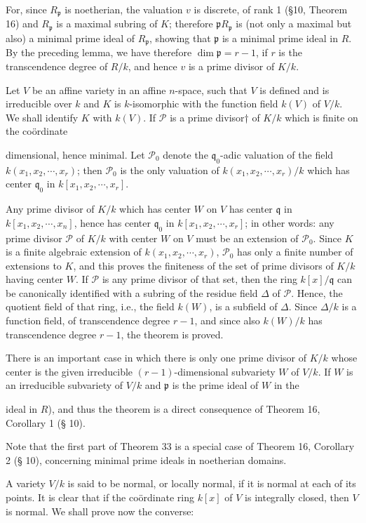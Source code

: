 For, since $R_{\mathfrak{p}}$ is noetherian, the valuation $v$ is discrete, of rank 1 (§10, Theorem 16) and $R_{\mathfrak{p}}$ is a maximal subring of $K$; therefore $\mathfrak{p}R_{\mathfrak{p}}$ is (not only a maximal but also) a minimal prime ideal of $R_{\mathfrak{p}}$, showing that $\mathfrak{p}$ is a minimal prime ideal in $R$. By the preceding lemma, we have therefore $\dim \mathfrak{p} = r-1$, if $r$ is the transcendence degree of $R/k$, and hence $v$ is a prime divisor of $K/k$.

Let $V$ be an affine variety in an affine $n$-space, such that $V$ is defined and is irreducible over $k$ and $K$ is $k$-isomorphic with the function field $k(V)$ of $V/k$. We shall identify $K$ with $k(V)$. If $\mathcal{P}$ is a prime divisor† of $K/k$ which is finite on the coördinate

dimensional, hence minimal. Let $\mathcal{P}_0$ denote the $\mathfrak{q}_0$-adic valuation of the field $k(x_1, x_2, \cdots, x_r)$; then $\mathcal{P}_0$ is the only valuation of $k(x_1, x_2, \cdots, x_r)/k$ which has center $\mathfrak{q}_0$ in $k[x_1, x_2, \cdots, x_r]$.

Any prime divisor of $K/k$ which has center $W$ on $V$ has center $\mathfrak{q}$ in $k[x_1, x_2, \cdots, x_n]$, hence has center $\mathfrak{q}_0$ in $k[x_1, x_2, \cdots, x_r]$; in other words: any prime divisor $\mathcal{P}$ of $K/k$ with center $W$ on $V$ must be an extension of $\mathcal{P}_0$. Since $K$ is a finite algebraic extension of $k(x_1, x_2, \cdots, x_r)$, $\mathcal{P}_0$ has only a finite number of extensions to $K$, and this proves the finiteness of the set of prime divisors of $K/k$ having center $W$. If $\mathcal{P}$ is any prime divisor of that set, then the ring $k[x]/\mathfrak{q}$ can be canonically identified with a subring of the residue field $\Delta$ of $\mathcal{P}$. Hence, the quotient field of that ring, i.e., the field $k(W)$, is a subfield of $\Delta$. Since $\Delta/k$ is a function field, of transcendence degree $r-1$, and since also $k(W)/k$ has transcendence degree $r-1$, the theorem is proved.

There is an important case in which there is only one prime divisor of $K/k$ whose center is the given irreducible $(r-1)$-dimensional subvariety $W$ of $V/k$. If $W$ is an irreducible subvariety of $V/k$ and $\mathfrak{p}$ is the prime ideal of $W$ in the

ideal in $R$), and thus the theorem is a direct consequence of Theorem 16, Corollary 1 (§ 10).

Note that the first part of Theorem 33 is a special case of Theorem 16, Corollary 2 (§ 10), concerning minimal prime ideals in noetherian domains.

A variety $V/k$ is said to be normal, or locally normal, if it is normal at each of its points. It is clear that if the coördinate ring $k[x]$ of $V$ is integrally closed, then $V$ is normal. We shall prove now the converse: